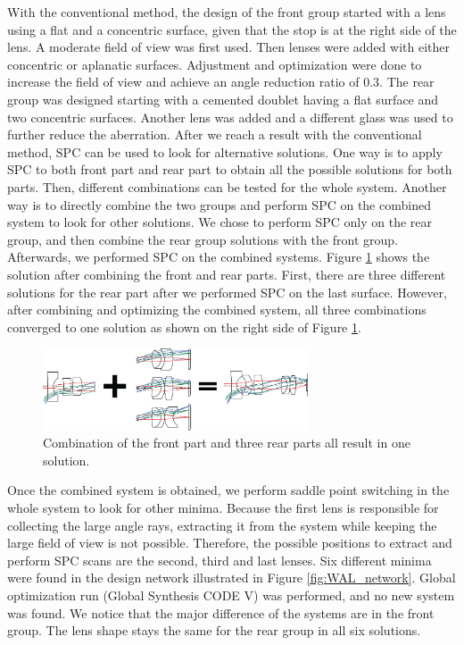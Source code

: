 With the conventional method, the design of the front group started with a lens using a flat and a concentric surface, given that the stop is at the right side of the lens. A moderate field of view was first used. Then lenses were added with either concentric or aplanatic surfaces. Adjustment and optimization were done to increase the field of view and achieve an angle reduction ratio of 0.3. The rear group was designed starting with a cemented doublet having a flat surface and two concentric surfaces. Another lens was added and a different glass was used to further reduce the aberration. 
After we reach a result with the conventional method, SPC can be used to look for alternative solutions. One way is to apply SPC to both front part and rear part to obtain all the possible solutions for both parts. Then, different combinations can be tested for the whole system. Another way is to directly combine the two groups and perform SPC on the combined system to look for other solutions. We chose to perform SPC only on the rear group, and then combine the rear group solutions with the front group. Afterwards, we performed SPC on the combined systems.
Figure \ref{fig:WAL_combine} shows the solution after combining the front and rear parts. First, there are three different solutions for the rear part after we performed SPC on the last surface. However, after combining and optimizing the combined system, all three combinations converged to one solution as shown on the right side of Figure \ref{fig:WAL_combine}. 

\begin{figure}[h!]
    \centering
    \includegraphics[width=0.7\textwidth]{chapter-4/figures/WAL_combine.png}
    \caption{Combination of the front part and three rear parts all result in one solution.}
    \label{fig:WAL_combine}
\end{figure}

Once the combined system is obtained, we perform saddle point switching in the whole system to look for other minima. Because the first lens is responsible for collecting the large angle rays, extracting it from the system while keeping the large field of view is not possible. Therefore, the possible positions to extract and perform SPC scans are the second, third and last lenses. Six different minima were found in the design network illustrated in Figure \ref{fig:WAL_network}. Global optimization run (Global Synthesis CODE V) was performed, and no new system was found. We notice that the major difference of the systems are in the front group. The lens shape stays the same for the rear group in all six solutions.

